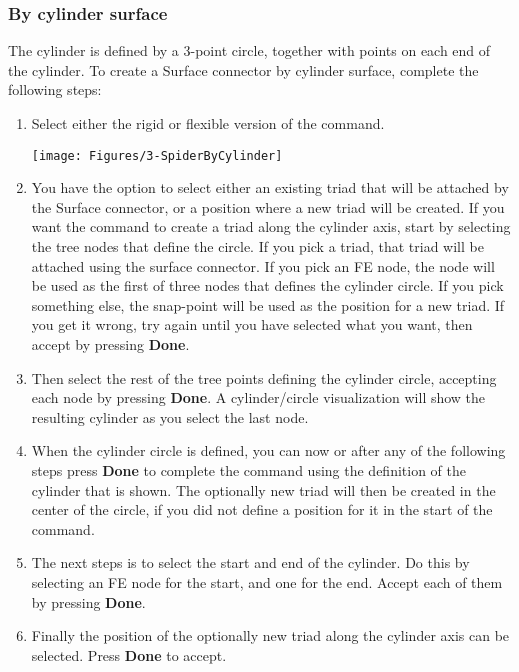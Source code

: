 \subsubsection{By cylinder surface}


The cylinder is defined by a 3-point circle,
together with points on each end of the cylinder.
To create a Surface connector by cylinder surface, complete the following steps:

\begin{enumerate}
\item
  Select either the rigid or flexible version of the command.
  \begin{center}
    \texttt{[image: Figures/3-SpiderByCylinder]}
  \end{center}

\item
  You have the option to select either an existing triad that will be attached
  by the Surface connector, or a position where a new triad will be created.
  If you want the command to create a triad along the cylinder axis,
  start by selecting the tree nodes that define the circle.
  If you pick a triad, that triad will be attached using the surface connector.
  If you pick an FE node, the node will be used as the first of three nodes that
  defines the cylinder circle. If you pick something else,
  the snap-point will be used as the position for a new triad.
  If you get it wrong, try again until you have selected what you want,
  then accept by pressing \textbf{Done}.

\item
  Then select the rest of the tree points defining the cylinder circle,
  accepting each node by pressing \textbf{Done}.
  A cylinder/circle visualization will show the resulting cylinder
  as you select the last node.

\item
  When the cylinder circle is defined, you can now or after any of the following
  steps press \textbf{Done} to complete the command using the definition of the
  cylinder that is shown.
  The optionally new triad will then be created in the center of the circle,
  if you did not define a position for it in the start of the command.

\item
  The next steps is to select the start and end of the cylinder.
  Do this by selecting an FE node for the start, and one for the end.
  Accept each of them by pressing \textbf{Done}.

\item
  Finally the position of the optionally new triad along the cylinder axis
  can be selected. Press \textbf{Done} to accept.
\end{enumerate}

